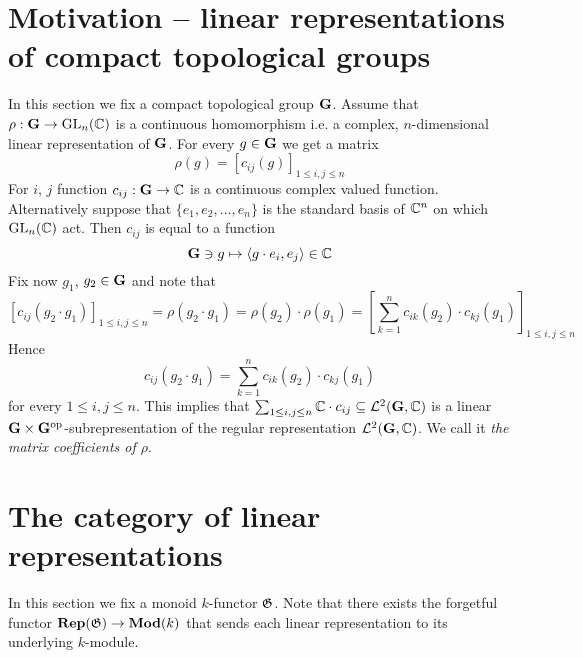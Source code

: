 \section{Motivation -- linear representations of compact topological groups}
\noindent
In this section we fix a compact topological group $\mathbf{G}$.
Assume that $\rho:\mathbf{G}\rightarrow \mathrm{GL}_n({\mathbb C})$ is a continuous homomorphism i.e. a complex, $n$-dimensional linear representation of $\mathbf{G}$. For every $g\in \mathbf{G}$ we get a matrix
$$\rho(g)=\left[c_{ij}(g)\right]_{1\leq i, j \leq n}$$
For $i$, $j$ function $c_{ij}:\mathbf{G}\rightarrow {\mathbb C}$ is a continuous complex valued function. Alternatively suppose that $\{e_1,e_2,...,e_n\}$ is the standard basis of ${\mathbb C}^n$ on which $\mathrm{GL}_n({\mathbb C})$ act. Then $c_{ij}$ is equal to a function 
$$\mathbf{G}\ni g \mapsto \langle g\cdot e_i, e_j\rangle \in {\mathbb C}$$
Fix now $g_1$, $g_2\in \mathbf{G}$ and note that
$$\left[c_{ij}(g_2\cdot g_1)\right]_{1\leq i,j\leq n}  = \rho(g_2\cdot g_1) = \rho(g_2)\cdot \rho(g_1) = \left[\sum_{k=1}^nc_{ik}(g_2)\cdot c_{kj}(g_1)\right]_{1\leq i,j\leq n}$$
Hence 
$$c_{ij}(g_2\cdot g_1) = \sum_{k=1}^nc_{ik}(g_2)\cdot c_{kj}(g_1)$$
for every $1\leq i,j\leq n$. This implies that $\sum_{1\leq i,j\leq n}{\mathbb C}\cdot c_{ij}\subseteq {\mathcal L}^2(\mathbf{G},{\mathbb C})$ is a linear $\mathbf{G}\times \mathbf{G}^{\mathrm{op}}$-subrepresentation of the regular representation ${\mathcal L}^2(\mathbf{G},{\mathbb C})$. We call it \textit{the matrix coefficients of $\rho$}. 


\section{The category of linear representations}
\noindent
In this section we fix a monoid $k$-functor ${\mathfrak G}$. Note that there exists the forgetful functor $\mathbf{Rep}({\mathfrak G})\rightarrow \mathbf{Mod}(k)$ that sends each linear representation to its underlying $k$-module.


